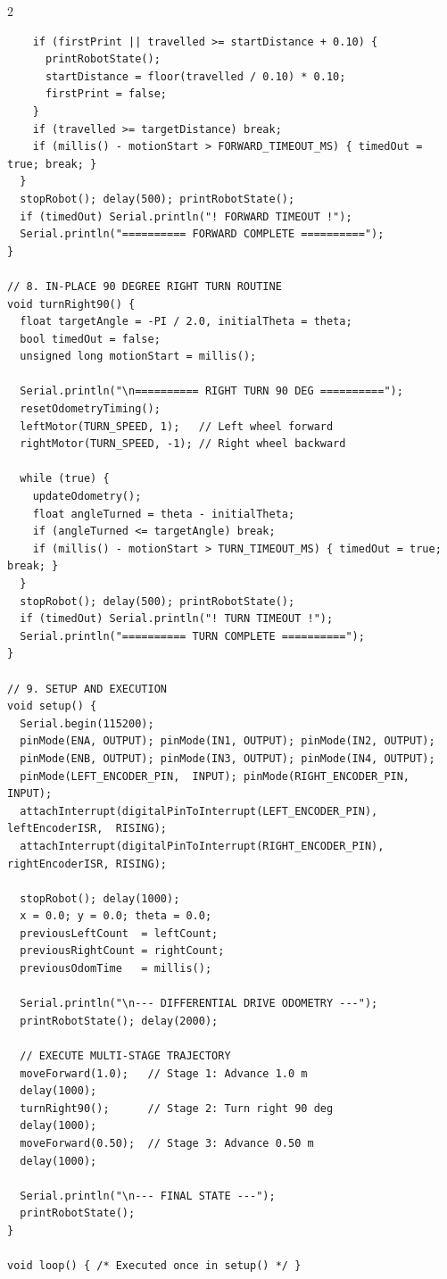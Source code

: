 \documentclass[11pt,a4paper]{article}
\begin{document}
\begin{multicols}{2}
\begin{lstlisting}
    if (firstPrint || travelled >= startDistance + 0.10) {
      printRobotState();
      startDistance = floor(travelled / 0.10) * 0.10;
      firstPrint = false;
    }
    if (travelled >= targetDistance) break;
    if (millis() - motionStart > FORWARD_TIMEOUT_MS) { timedOut = true; break; }
  }
  stopRobot(); delay(500); printRobotState();
  if (timedOut) Serial.println("! FORWARD TIMEOUT !");
  Serial.println("========== FORWARD COMPLETE ==========");
}

// 8. IN-PLACE 90 DEGREE RIGHT TURN ROUTINE
void turnRight90() {
  float targetAngle = -PI / 2.0, initialTheta = theta;
  bool timedOut = false;
  unsigned long motionStart = millis();

  Serial.println("\n========== RIGHT TURN 90 DEG ==========");
  resetOdometryTiming();
  leftMotor(TURN_SPEED, 1);   // Left wheel forward
  rightMotor(TURN_SPEED, -1); // Right wheel backward

  while (true) {
    updateOdometry();
    float angleTurned = theta - initialTheta;
    if (angleTurned <= targetAngle) break;
    if (millis() - motionStart > TURN_TIMEOUT_MS) { timedOut = true; break; }
  }
  stopRobot(); delay(500); printRobotState();
  if (timedOut) Serial.println("! TURN TIMEOUT !");
  Serial.println("========== TURN COMPLETE ==========");
}

// 9. SETUP AND EXECUTION
void setup() {
  Serial.begin(115200);
  pinMode(ENA, OUTPUT); pinMode(IN1, OUTPUT); pinMode(IN2, OUTPUT);
  pinMode(ENB, OUTPUT); pinMode(IN3, OUTPUT); pinMode(IN4, OUTPUT);
  pinMode(LEFT_ENCODER_PIN,  INPUT); pinMode(RIGHT_ENCODER_PIN, INPUT);
  attachInterrupt(digitalPinToInterrupt(LEFT_ENCODER_PIN),  leftEncoderISR,  RISING);
  attachInterrupt(digitalPinToInterrupt(RIGHT_ENCODER_PIN), rightEncoderISR, RISING);

  stopRobot(); delay(1000);
  x = 0.0; y = 0.0; theta = 0.0;
  previousLeftCount  = leftCount;
  previousRightCount = rightCount;
  previousOdomTime   = millis();

  Serial.println("\n--- DIFFERENTIAL DRIVE ODOMETRY ---");
  printRobotState(); delay(2000);

  // EXECUTE MULTI-STAGE TRAJECTORY
  moveForward(1.0);   // Stage 1: Advance 1.0 m
  delay(1000);
  turnRight90();      // Stage 2: Turn right 90 deg
  delay(1000);
  moveForward(0.50);  // Stage 3: Advance 0.50 m
  delay(1000);

  Serial.println("\n--- FINAL STATE ---");
  printRobotState();
}

void loop() { /* Executed once in setup() */ }
\end{lstlisting}
\end{multicols}
\end{document}

